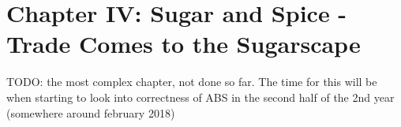 \section{Chapter IV: Sugar and Spice - Trade Comes to the Sugarscape}
TODO: the most complex chapter, not done so far. The time for this will be when starting to look into correctness of ABS in the second half of the 2nd year (somewhere around february 2018)